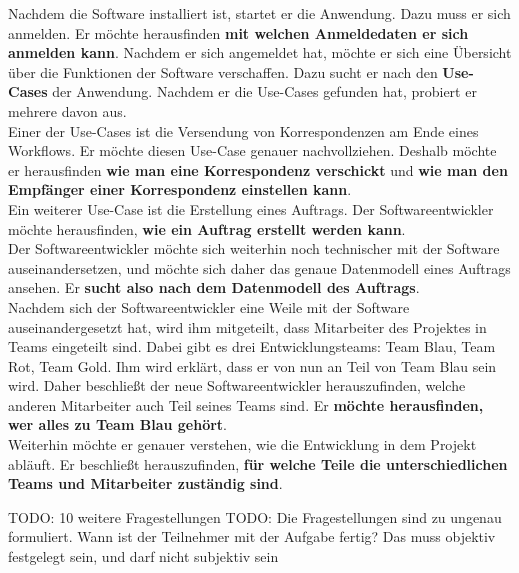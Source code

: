 Nachdem die Software installiert ist, startet er die Anwendung.
Dazu muss er sich anmelden.
Er möchte herausfinden \textbf{mit welchen Anmeldedaten er sich anmelden kann}.
Nachdem er sich angemeldet hat, möchte er sich eine Übersicht über die Funktionen der Software verschaffen.
Dazu sucht er nach den \textbf{Use-Cases} der Anwendung.
Nachdem er die Use-Cases gefunden hat, probiert er mehrere davon aus.\\

Einer der Use-Cases ist die Versendung von Korrespondenzen am Ende eines Workflows.
Er möchte diesen Use-Case genauer nachvollziehen.
Deshalb möchte er herausfinden \textbf{wie man eine Korrespondenz verschickt} und \textbf{wie man den Empfänger einer Korrespondenz einstellen kann}.\\

Ein weiterer Use-Case ist die Erstellung eines Auftrags.
Der Softwareentwickler möchte herausfinden, \textbf{wie ein Auftrag erstellt werden kann}.\\

Der Softwareentwickler möchte sich weiterhin noch technischer mit der Software auseinandersetzen, und möchte sich daher das genaue Datenmodell eines Auftrags ansehen.
Er \textbf{sucht also nach dem Datenmodell des Auftrags}.\\

Nachdem sich der Softwareentwickler eine Weile mit der Software auseinandergesetzt hat, wird ihm mitgeteilt, dass Mitarbeiter des Projektes in Teams eingeteilt sind.
Dabei gibt es drei Entwicklungsteams: Team Blau, Team Rot, Team Gold.
Ihm wird erklärt, dass er von nun an Teil von Team Blau sein wird.
Daher beschließt der neue Softwareentwickler herauszufinden, welche anderen Mitarbeiter auch Teil seines Teams sind.
Er \textbf{möchte herausfinden, wer alles zu Team Blau gehört}.\\

Weiterhin möchte er genauer verstehen, wie die Entwicklung in dem Projekt abläuft.
Er beschließt herauszufinden, \textbf{für welche Teile die unterschiedlichen Teams und Mitarbeiter zuständig sind}.

TODO: 10 weitere Fragestellungen
TODO: Die Fragestellungen sind zu ungenau formuliert. Wann ist der Teilnehmer mit der Aufgabe fertig? Das muss objektiv festgelegt sein, und darf nicht subjektiv sein

